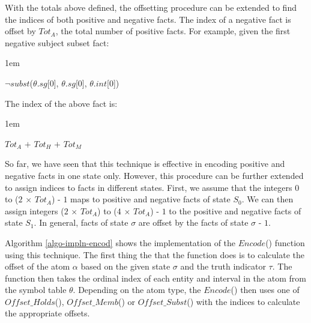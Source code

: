 \documentclass[11pt]{report}
\newenvironment{vquote}
{
  \begin{list}{}{\leftmargin 1em}\item[]
}
{
  \end{list}
}
\begin{document}
        With the totals above defined, the offsetting procedure can be
        extended to find the indices of both positive and negative facts. The
        index of a negative fact is offset by $Tot_A$, the total number of
        positive facts. For example, given the first negative subject subset
        fact:

        \begin{vquote}
          $\lnot$$subst$($\theta$.$sg$[$0$], $\theta$.$sg$[$0$], $\theta$.$int$[$0$])
        \end{vquote}

        \noindent
        The index of the above fact is:

        \begin{vquote}
          $Tot_A$ $+$ $Tot_H$ $+$ $Tot_M$
        \end{vquote}

        So far, we have seen that this technique is effective in encoding
        positive and negative facts in one state only. However, this
        procedure can be further extended to assign indices to facts in
        different states. First, we assume that the integers $0$ to
        ($2$ $\times$ $Tot_A$) - $1$ maps to positive and negative facts of
        state $S_0$. We can then assign integers ($2$ $\times$ $Tot_A$) to
        ($4$ $\times$ $Tot_A$) - $1$ to the positive and negative facts of
        state $S_1$. In general, facts of state $\sigma$ are offset by the
        facts of state $\sigma$ - $1$.

        Algorithm \ref{algo-impln-encod} shows the implementation of the
        $Encode$() function using this technique. The first thing the
        that the function does is to calculate the offset of the atom
        $\alpha$ based on the given state $\sigma$ and the truth
        indicator $\tau$. The function then takes the ordinal index of each
        entity and interval in the atom from the symbol table $\theta$.
        Depending on the atom type, the $Encode$() then uses one of
        $Offset\_Holds$(), $Offset\_Memb$() or $Offset\_Subst$() with the
        indices to calculate the appropriate offsets.
\end{document}
